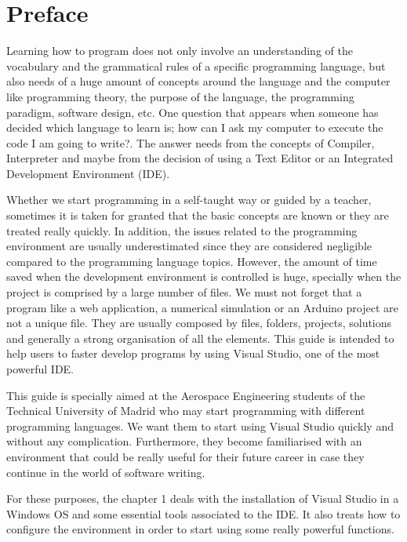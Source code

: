\chapter*{Preface}

Learning how to program does not only involve an understanding of the vocabulary and the grammatical rules of a specific programming language, but also needs of a huge amount of concepts around the language and the computer like programming theory, the purpose of the language, the programming paradigm, software design, etc. One question that appears when someone has decided which language to learn is; how can I ask my computer to execute the code I am going to write?. The answer needs from the concepts of Compiler, Interpreter and maybe from the decision of using a Text Editor or an Integrated Development Environment (IDE).

Whether we start programming in a self-taught way or guided by a teacher, sometimes it is taken for granted that the basic concepts are known or they are treated really quickly. In addition, the issues related to the programming environment are usually underestimated since they are considered negligible compared to the programming language topics. However, the amount of time saved when the development environment is controlled is huge, specially when the project is comprised by a large number of files. We must not forget that a program like a web application, a numerical simulation or an Arduino project are not a unique file. They are usually composed by files, folders, projects, solutions and generally a strong organisation of all the elements. This guide is intended to help users to faster develop programs by using Visual Studio, one of the most powerful IDE.

This guide is specially aimed at the Aerospace Engineering students of the Technical University of Madrid who may start programming with different programming languages. We want them to start using Visual Studio quickly and without any complication. Furthermore, they become familiarised with an environment that could be really useful for their future career in case they continue in the world of software writing. 

For these purposes, the chapter 1 deals with the installation of Visual Studio in a Windows OS and some essential tools associated to the IDE. It also treats how to configure the environment in order to start using some really powerful functions. 

